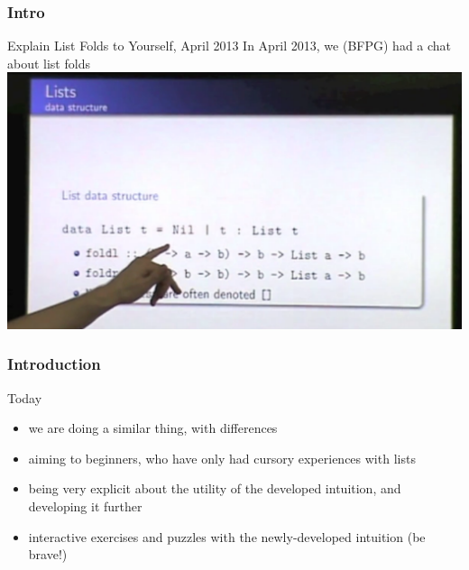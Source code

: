 \begin{frame}
\frametitle{Intro}
\begin{block}{Explain List Folds to Yourself, April 2013}
In April 2013, we (BFPG) had a chat about list folds
\includegraphics[height=0.5\textheight]{image/list-folds-2013.png}
\end{block}
\end{frame}

\begin{frame}
\frametitle{Introduction}
\begin{block}{Today}
\begin{itemize}
\item<1-> we are doing a similar thing, with differences
\item<2-> aiming to beginners, who have only had cursory experiences with lists
\item<3-> being very explicit about the utility of the developed intuition, and developing it further
\item<4-> interactive exercises and puzzles with the newly-developed intuition (be brave!)
\end{itemize}
\end{block}
\end{frame}
